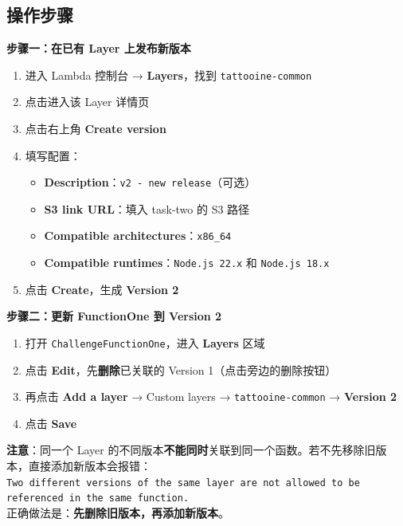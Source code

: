 \documentclass[12pt, a4paper]{article}
\begin{document}
\subsection{操作步骤}

\textbf{步骤一：在已有 Layer 上发布新版本}

\begin{enumerate}
  \item 进入 Lambda 控制台 → \textbf{Layers}，找到 \texttt{tattooine-common}
  \item 点击进入该 Layer 详情页
  \item 点击右上角 \textbf{Create version}
  \item 填写配置：
    \begin{itemize}
      \item \textbf{Description}：\texttt{v2 - new release}（可选）
      \item \textbf{S3 link URL}：填入 task-two 的 S3 路径
      \item \textbf{Compatible architectures}：\texttt{x86\_64}
      \item \textbf{Compatible runtimes}：\texttt{Node.js 22.x} 和 \texttt{Node.js 18.x}
    \end{itemize}
  \item 点击 \textbf{Create}，生成 \textbf{Version 2}
\end{enumerate}

\textbf{步骤二：更新 FunctionOne 到 Version 2}

\begin{enumerate}
  \item 打开 \texttt{ChallengeFunctionOne}，进入 \textbf{Layers} 区域
  \item 点击 \textbf{Edit}，先\textbf{删除}已关联的 Version 1（点击旁边的删除按钮）
  \item 再点击 \textbf{Add a layer} → Custom layers → \texttt{tattooine-common} → \textbf{Version 2}
  \item 点击 \textbf{Save}
\end{enumerate}

\begin{warnbox}
\textbf{注意}：同一个 Layer 的不同版本\textbf{不能同时}关联到同一个函数。若不先移除旧版本，直接添加新版本会报错：\\
\texttt{Two different versions of the same layer are not allowed to be referenced in the same function.}\\
正确做法是：\textbf{先删除旧版本，再添加新版本}。
\end{warnbox}
\end{document}
